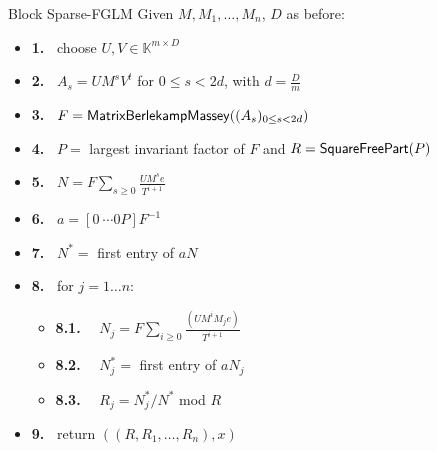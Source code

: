 \documentclass{beamer}
\begin{document}
\begin{frame}{Block Sparse-FGLM}
	Given $M,M_1,\dots,M_n$, $D$ as before:
		\begin{itemize}
			\item[]{\bf 1.~} {\sf choose $U,V \in \mathbb{K}^{m \times D}$}
			\item[]{\bf 2.~} {\sf $A_s = UM^sV^t$ for $0 \le s < 2d$, with $d = \frac{D}{m}$}
			\item[]{\bf 3.~} {\sf $F = {\sf MatrixBerlekampMassey}((A_s)_{0\le s < 2d})$}
			\item[]{\bf 4.~} {\sf $P=$ largest invariant factor of $F$ and $R={\sf SquareFreePart}(P)$}
			\item[]{\bf 5.~} {\sf $N = F\sum_{s\ge 0} \frac{UM^s e}{T^{i+1}}$}
			\item[]{\bf 6.~} {\sf $a = [0 ~\cdots 0 P] F^{-1}$}
			\item[]{\bf 7.~} {\sf $N^*=$ first entry of $aN$}
			\item[]{\bf 8.~} {\sf for $j = 1 \dots n$:}
			\begin{itemize}
				\item[]{\bf 8.1.} ~~{\sf $N_j = F\sum_{i\ge 0} \frac{(UM^i M_j e)}{T^{i+1}}$}
				\item[]{\bf 8.2.} ~~{\sf $N^*_j=$ first entry of $aN_j$}
				\item[]{\bf 8.3.} ~~{\sf $R_j=N^*_j/N^*$ mod $R$}
			\end{itemize}
			\item[]{\bf 9.~} {return $((R,R_1,\dots,R_n), x)$}
		\end{itemize}
\end{frame}
\end{document}
